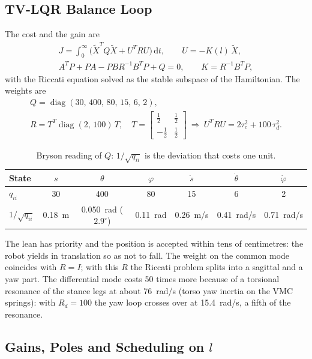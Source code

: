 \documentclass[11pt,a4paper]{article}
\newcommand{\dgr}{^{\circ}}
\begin{document}
\subsection{TV-LQR Balance Loop}

The cost and the gain are
\begin{gather}
    J = \int_0^\infty\big(\tilde X^{T}Q\tilde X + U^{T}RU\big)\,\mathrm{d}t,\qquad U = -K(l)\,\tilde X,\\
    A^{T}P + PA - PBR^{-1}B^{T}P + Q = 0,\qquad K = R^{-1}B^{T}P,
\end{gather}
with the Riccati equation solved as the stable subspace of the Hamiltonian.  The weights are
\begin{gather}
    Q = \operatorname{diag}(30,\,400,\,80,\,15,\,6,\,2),\\
    R = T^{T}\operatorname{diag}(2,\,100)\,T,\quad T=\begin{bmatrix}\tfrac12&\tfrac12\\-\tfrac12&\tfrac12\end{bmatrix}
    \ \Rightarrow\ U^{T}RU = 2\tau_c^2+100\,\tau_d^2 .
\end{gather}

\begin{table}[H]
    \centering
    \caption{Bryson reading of $Q$: $1/\sqrt{q_{ii}}$ is the deviation that costs one unit.}
    \label{tab:bryson}
    \begin{tabular}{lcccccc}
        \toprule
        State & $s$ & $\theta$ & $\varphi$ & $\dot s$ & $\dot\theta$ & $\dot\varphi$ \\
        \midrule
        $q_{ii}$ & 30 & 400 & 80 & 15 & 6 & 2 \\
        $1/\sqrt{q_{ii}}$ & 0.18~m & 0.050~rad ($2.9\dgr$) & 0.11~rad & 0.26~m/s & 0.41~rad/s & 0.71~rad/s \\
        \bottomrule
    \end{tabular}
\end{table}

The lean has priority and the position is accepted within tens of centimetres: the robot
yields in translation so as not to fall.  The weight on the common mode coincides with $R = I$;
with this $R$ the Riccati problem splits into a sagittal and a yaw part.  The differential mode
costs 50 times more because of a torsional resonance of the stance legs at about 76~rad/s
(torso yaw inertia on the VMC springs): with $R_d = 100$ the yaw loop crosses over at
15.4~rad/s, a fifth of the resonance.

\subsection{Gains, Poles and Scheduling on $l$}
\end{document}
